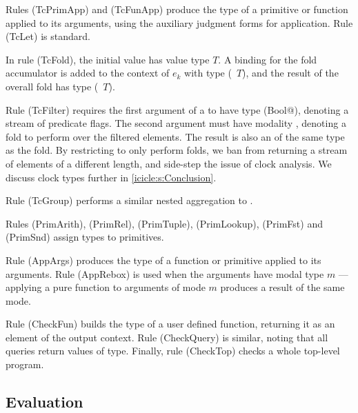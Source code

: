 Rules (TcPrimApp) and (TcFunApp) produce the type of a primitive or function applied to its arguments, using the auxiliary judgment forms for application.
Rule (TcLet) is standard.

In rule (TcFold), the initial value has value type $T$.
A binding for the fold accumulator is added to the context of $e_k$ with type (\Ic@Element@~$T$), and the result of the overall fold has type (\Ic@Aggregate@~$T$).

Rule (TcFilter) requires the first argument of a \Ic@filter@ to have type (\Ic@Element Bool@), denoting a stream of predicate flags.
The second argument must have modality \Ic@Aggregate@, denoting a fold to perform over the filtered elements.
The result is also an \Ic@Aggregate@ of the same type as the fold.
By restricting \Ic@filter@ to only perform folds, we ban \Ic@filter@ from returning a stream of elements of a different length, and side-step the issue of clock analysis.
We discuss clock types further in \cref{icicle:s:Conclusion}.

Rule (TcGroup) performs a similar nested aggregation to \Ic@filter@.

Rules (PrimArith), (PrimRel), (PrimTuple), (PrimLookup), (PrimFst) and (PrimSnd) assign types to primitives.

Rule (AppArgs) produces the type of a function or primitive applied to its arguments.
Rule (AppRebox) is used when the arguments have modal type $m$ --- applying a pure function to arguments of mode $m$ produces a result of the same mode.

Rule (CheckFun) builds the type of a user defined function, returning it as an element of the output context.
Rule (CheckQuery) is similar, noting that all queries return values of \Ic@Aggregate@ type.
Finally, rule (CheckTop) checks a whole top-level program.


\subsection{Evaluation}


